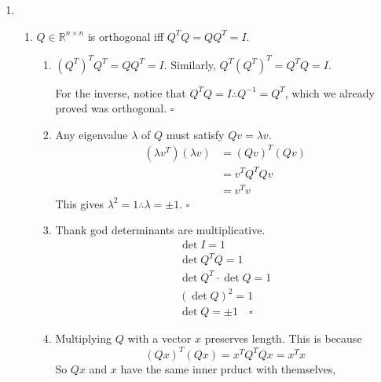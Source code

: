 \documentclass[12pt]{article}
\begin{document}
\begin{enumerate}
      \item \begin{enumerate}
                  \item $Q \in \mathbb{R}^{n \times n}$ is orthogonal iff $Q^TQ=QQ^T=I$.
                        \begin{enumerate}
                              \item $\left(Q^T\right)^T Q^T=Q Q^T=I$.
                                    Similarly, $Q^T\left(Q^T\right)^T=Q^T Q=I$.

                                    For the inverse, notice that $Q^T Q=I \therefore Q^{-1}=Q^T$,
                                    which we already proved was orthogonal. $\square$
                              \item Any eigenvalue $\lambda$ of $Q$ must satisfy $Qv=\lambda v$.
                                    \begin{align*}
                                          \left(\lambda v^T\right) (\lambda v)
                                           & = (Qv)^T (Qv) \\
                                           & = v^T Q^T Qv  \\
                                           & = v^T v
                                    \end{align*}
                                    This gives $\lambda^2=1 \therefore \lambda=\pm 1$. $\square$
                              \item Thank god determinants are multiplicative.
                                    \begin{gather*}
                                          \det I = 1 \\
                                          \det Q^T Q = 1 \\
                                          \det Q^T \cdot \det Q = 1 \\
                                          (\det Q)^2 = 1 \\
                                          \det Q = \pm 1 \quad\square
                                    \end{gather*}
                              \item Multiplying $Q$ with a vector $x$ preserves length.
                                    This is because
                                    \[(Qx)^T(Qx) = x^T Q^T Q x = x^T x\]
                                    So $Qx$ and $x$ have the same inner prduct with themselves,

\end{enumerate}
\end{enumerate}
\end{enumerate}
\end{document}
